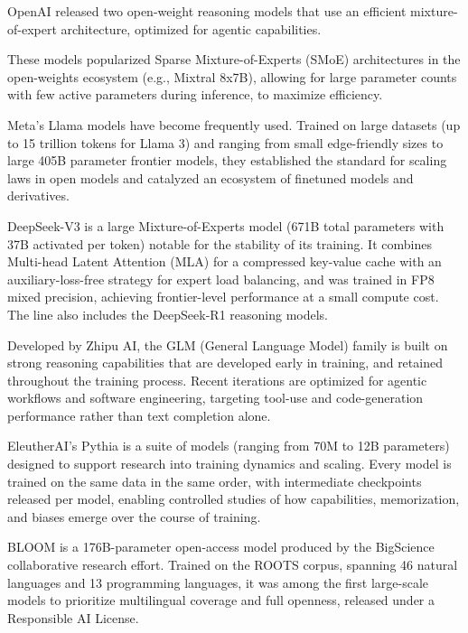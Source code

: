 \begin{description}[font=\bfseries]
    \item[gpt-oss] \citep{openai2025gptoss120bgptoss20bmodel} OpenAI released two open-weight reasoning models that use an efficient mixture-of-expert architecture, optimized for agentic capabilities.
    \item[Mixtral series] \citep{jiang2024mixtralexperts} These models popularized Sparse Mixture-of-Experts (SMoE) architectures in the open-weights ecosystem (e.g., Mixtral 8x7B), allowing for large parameter counts with  few active parameters during inference, to maximize efficiency.
    \item[Llama series] \citep{grattafiori2024llama3herdmodels} Meta's Llama models have become frequently used. Trained on large datasets (up to 15 trillion tokens for Llama 3) and ranging from small edge-friendly sizes to large 405B parameter frontier models, they established the standard for scaling laws in open models and catalyzed an  ecosystem of finetuned models and derivatives.
    \item[DeepSeek] \citep{deepseekai2025deepseekv3technicalreport} DeepSeek-V3 is a large Mixture-of-Experts model (671B total parameters with 37B activated per token) notable for the stability of its training. It combines Multi-head Latent Attention (MLA) for a compressed key-value cache with an auxiliary-loss-free strategy for expert load balancing, and was trained in FP8 mixed precision, achieving frontier-level performance at a small compute cost. The line also includes the DeepSeek-R1 reasoning models.
    \item[GLM] \citep{glm5team2026glm5vibecodingagentic} Developed by Zhipu AI, the GLM (General Language Model) family is built on strong reasoning capabilities that are developed early in training, and retained throughout the training process. Recent iterations are  optimized for agentic workflows and software engineering, targeting  tool-use and code-generation performance rather than text completion alone.
    \item[Pythia] \citep{biderman2023pythia} EleutherAI's Pythia is a suite of models (ranging from 70M to 12B parameters) designed  to support research into training dynamics and scaling. Every model is trained on the same data in the same order, with  intermediate checkpoints released per model, enabling controlled studies of how capabilities, memorization, and biases emerge over the course of training.
    \item[BLOOM] \citep{workshop2023bloom176bparameteropenaccessmultilingual} BLOOM is a 176B-parameter open-access model produced by the BigScience collaborative research effort. Trained on the ROOTS corpus, spanning 46 natural languages and 13 programming languages, it was among the first large-scale models to prioritize multilingual coverage and full openness, released under a Responsible AI License.

\end{description}

